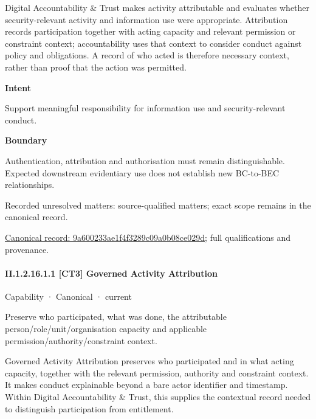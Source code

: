 Digital Accountability \& Trust makes activity attributable and evaluates whether security-relevant activity and information use were appropriate. Attribution records participation together with acting capacity and relevant permission or constraint context; accountability uses that context to consider conduct against policy and obligations. A record of who acted is therefore necessary context, rather than proof that the action was permitted.



\textbf{Intent}



Support meaningful responsibility for information use and security-relevant conduct.



\textbf{Boundary}



Authentication, attribution and authorisation must remain distinguishable. Expected downstream evidentiary use does not establish new BC-to-BEC relationships.


{\small Recorded unresolved matters: source-qualified matters; exact scope remains in the canonical record.}\par
{\footnotesize \href{../../../../continuum/strategy/capability/9a600233ae1f4f3289c09a0b08ce029d.md}{Canonical record: 9a600233ae1f4f3289c09a0b08ce029d}; full qualifications and provenance.}\par
\paragraph*{II.1.2.16.1.1 [CT3] Governed Activity Attribution}
\label{navigation:II.1.2.16.1.1}

\label{element:646b3fd80a8b4f269691db7942e0f809}
{\small Capability · Canonical · current}\par

Preserve who participated, what was done, the attributable person/role/unit/organisation capacity and applicable permission/authority/constraint context.



Governed Activity Attribution preserves who participated and in what acting capacity, together with the relevant permission, authority and constraint context. It makes conduct explainable beyond a bare actor identifier and timestamp. Within Digital Accountability \& Trust, this supplies the contextual record needed to distinguish participation from entitlement.



